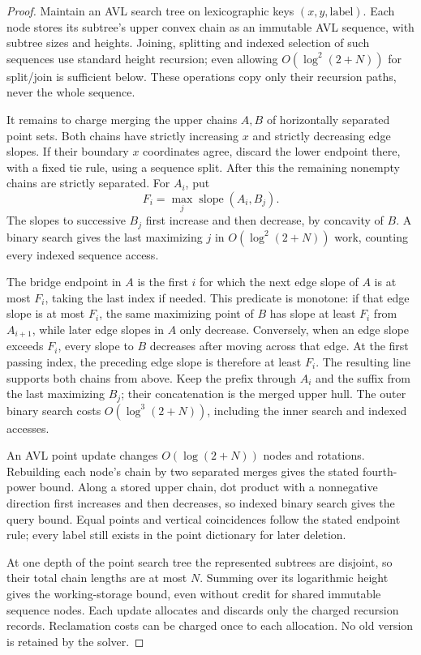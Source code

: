 \begin{proof}
Maintain an AVL search tree on lexicographic keys $(x,y,\text{label})$.
Each node stores its subtree's upper convex chain as an immutable AVL
sequence, with subtree sizes and heights. Joining, splitting and indexed
selection of such sequences use standard height recursion; even allowing
$O(\log^2(2+N))$ for split/join is sufficient below. These operations copy
only their recursion paths, never the whole sequence.

It remains to charge merging the upper chains $A,B$ of horizontally
separated point sets. Both chains have strictly increasing $x$ and strictly
decreasing edge slopes. If their boundary $x$ coordinates agree, discard
the lower endpoint there, with a fixed tie rule, using a sequence split.
After this the remaining nonempty chains are strictly separated.
For $A_i$, put
\[
 F_i=\max_j\operatorname{slope}(A_i,B_j).
\]
The slopes to successive $B_j$ first increase and then decrease, by
concavity of $B$. A binary search gives the last maximizing $j$ in
$O(\log^2(2+N))$ work, counting every indexed sequence access.

The bridge endpoint in $A$ is the first $i$ for which the next edge slope
of $A$ is at most $F_i$, taking the last index if needed. This predicate
is monotone: if that edge slope is at most $F_i$, the same maximizing
point of $B$ has slope at least $F_i$ from $A_{i+1}$, while later edge
slopes in $A$ only decrease. Conversely, when an edge slope exceeds
$F_i$, every slope to $B$ decreases after moving across that edge.
At the first passing index, the preceding edge slope is therefore at least
$F_i$. The resulting line supports both chains from above. Keep the prefix
through $A_i$ and the suffix from the last maximizing $B_j$; their
concatenation is the merged upper hull. The outer binary search costs
$O(\log^3(2+N))$, including the inner search and indexed accesses.

An AVL point update changes $O(\log(2+N))$ nodes and rotations. Rebuilding
each node's chain by two separated merges gives the stated fourth-power
bound. Along a stored upper chain, dot product with a nonnegative direction
first increases and then decreases, so indexed binary search gives the
query bound. Equal points and vertical coincidences follow the stated
endpoint rule; every label still exists in the point dictionary for later
deletion.

At one depth of the point search tree the represented subtrees are
disjoint, so their total chain lengths are at most $N$. Summing over its
logarithmic height gives the working-storage bound, even without credit
for shared immutable sequence nodes. Each update allocates and discards
only the charged recursion records. Reclamation costs can be charged once
to each allocation. No old version is retained by the solver.
\end{proof}

